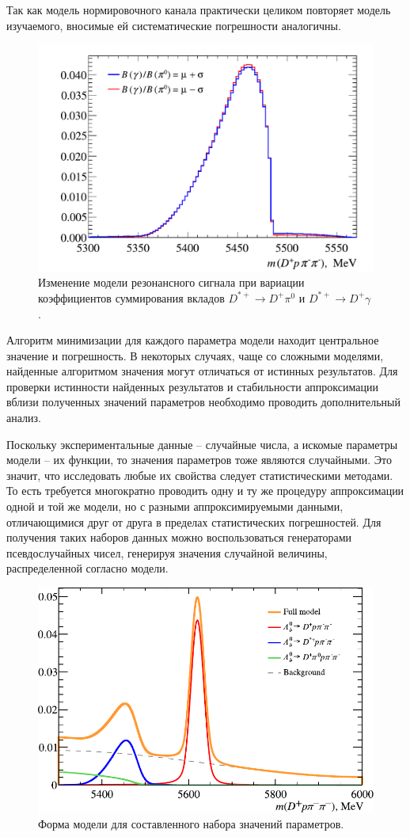 \documentclass[a4paper, 12pt]{article}
\def\Dp{D^+}
\def\Dsp{D^{*+}}
\def\piz{\pi^0}
\begin{document}
Так как модель нормировочного канала практически целиком повторяет модель изучаемого, вносимые ей систематические погрешности аналогичны. 


\begin{figure}
\includegraphics[width=.5\linewidth]{figures/Neutral_particles_syst}
\caption{Изменение модели резонансного сигнала при вариации коэффициентов суммирования вкладов $\Dsp\to\Dp\piz$ и $\Dsp\to\Dp\gamma$.}
\label{fig:neutral_syst}
\end{figure}


Алгоритм минимизации для каждого параметра модели находит центральное значение и погрешность. 
В некоторых случаях, чаще со сложными моделями, найденные алгоритмом значения могут отличаться от истинных результатов. 
Для проверки истинности найденных результатов и стабильности аппроксимации вблизи полученных значений параметров необходимо проводить дополнительный анализ. 

Поскольку экспериментальные данные -- случайные числа, а искомые параметры модели -- их функции, то значения параметров тоже являются случайными. 
Это значит, что исследовать любые их свойства следует статистическими методами. 
То есть требуется многократно проводить одну и ту же процедуру аппроксимации одной и той же модели, но с разными аппроксимируемыми данными, отличающимися друг от друга в пределах статистических погрешностей. 
Для получения таких наборов данных можно воспользоваться генераторами псевдослучайных чисел, генерируя значения случайной величины, распределенной согласно модели. 

\begin{figure}
\includegraphics[width=.5\linewidth]{figures/model_plot}
\caption{Форма модели для составленного набора значений параметров.}
\label{fig:model}
\end{figure}
\end{document}
